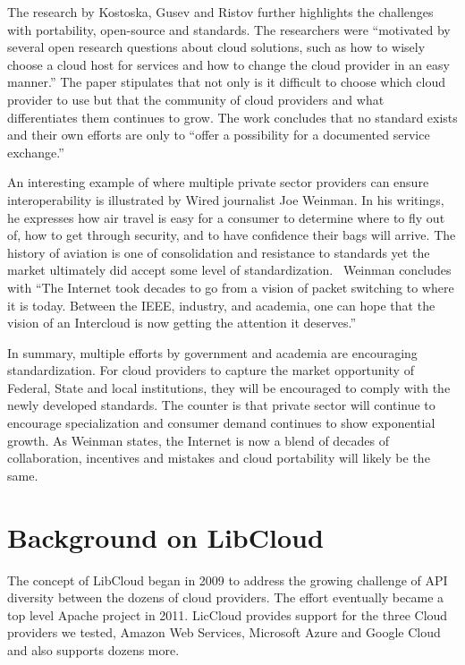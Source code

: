 The research by Kostoska, Gusev and Ristov further highlights the
challenges with portability, open-source and standards. The
researchers were ``motivated by several open research questions about
cloud solutions, such as how to wisely choose a cloud host for
services and how to change the cloud provider in an easy
manner.''\cite{hid-sp18-518-Kostoska-Gusev-Ristov} The paper
stipulates that not only is it difficult to choose which cloud
provider to use but that the community of cloud providers and what
differentiates them continues to grow. The work concludes that no
standard exists and their own efforts are only to ``offer a
possibility for a documented service exchange.''

An interesting example of where multiple private sector providers can ensure
interoperability is illustrated by Wired journalist Joe Weinman. In his
writings, he expresses how air travel is easy for a consumer to determine where
to fly out of, how to get through security, and to have confidence their bags
will arrive. The history of aviation is one of consolidation and resistance to
standards yet the market ultimately did accept some level of
standardization.~\cite{hid-sp18-518-Wired} Weinman concludes with ``The
Internet
took decades to go from a vision of packet switching to where it is today. 
Between the IEEE, industry, and academia, one can hope that the vision of an
Intercloud is now getting the attention it deserves.''

In summary, multiple efforts by government and academia are encouraging
standardization. For cloud providers to capture the market opportunity of
Federal, State and local institutions, they will be encouraged to comply with
the newly developed standards. The counter is that private sector will continue
to encourage specialization and consumer demand continues to show exponential
growth. As Weinman states, the Internet is now a blend of decades of
collaboration, incentives and mistakes and cloud portability will likely be the
same.

\section{Background on LibCloud}

The concept of LibCloud began in 2009 to address the growing challenge of API
diversity between the dozens of cloud providers. The effort eventually became a
top level Apache project in 2011. LicCloud provides support for the three Cloud
providers we tested, Amazon Web Services, Microsoft Azure and Google Cloud and
also supports dozens more.

